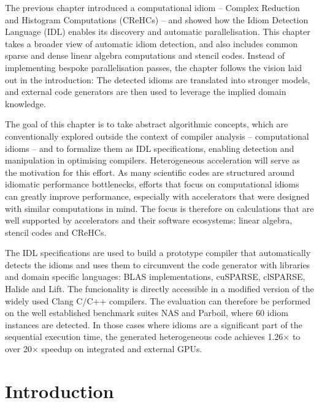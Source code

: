 
    The previous chapter introduced a computational idiom --
    Complex Reduction and Histogram Computations (CReHCs) -- and showed how the
    Idiom Detection Language (IDL) enables its discovery and automatic
    parallelisation.
    This chapter takes a broader view of automatic idiom detection, and also
    includes common sparse and dense linear algebra computations and stencil
    codes.
    Instead of implementing bespoke parallelisation passes, the chapter
    follows the vision laid out in the introduction:
    The detected idioms are translated into stronger models, and external
    code generators are then used to leverage the implied domain knowledge.

    The goal of this chapter is to take abstract algorithmic concepts, which are
    conventionally explored outside the context of compiler analysis --
    computational idioms -- and to formalize them as IDL specifications,
    enabling detection and manipulation in optimising compilers.
    Heterogeneous acceleration will serve as the motivation for this effort.
    As many scientific codes are structured around idiomatic performance
    bottlenecks, efforts that focus on computational idioms can greatly
    improve performance, especially with accelerators that were designed
    with similar computations in mind.
    The focus is therefore on calculations that are well supported by
    accelerators and their software ecosystems: linear algebra,
    stencil codes and CReHCs.

    The IDL specifications are used to build a prototype compiler that
    automatically detects the idioms and uses them to circumvent the code
    generator with libraries and domain specific languages:
    BLAS implementations, cuSPARSE, clSPARSE, Halide and Lift.
    The funcionality is directly accessible in a modified version of the widely
    used Clang C/C++ compilers.
    The evaluation can therefore be performed on the well established benchmark
    suites NAS and Parboil, where 60 idiom instances are detected.
    In those cases where idioms are a significant part of the sequential
    execution time, the generated heterogeneous code achieves 1.26$\times$ to
    over 20$\times$ speedup on integrated and external GPUs.

\section{Introduction}


